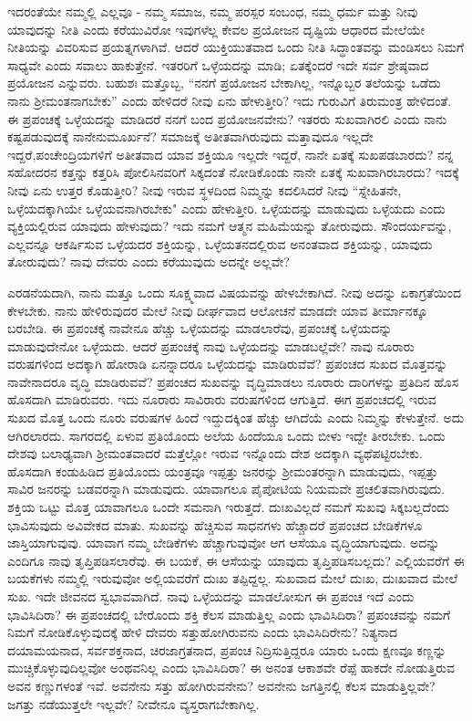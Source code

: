 ಇದರಂತೆಯೇ ನಮ್ಮಲ್ಲಿ ಎಲ್ಲವೂ - ನಮ್ಮ ಸಮಾಜ, ನಮ್ಮ ಪರಸ್ಪರ ಸಂಬಂಧ, ನಮ್ಮ ಧರ್ಮ ಮತ್ತು ನೀವು ಯಾವುದನ್ನು ನೀತಿ ಎಂದು ಕರೆಯುವಿರೋ ಇವುಗಳೆಲ್ಲ ಕೇವಲ ಪ್ರಯೋಜನ ದೃಷ್ಟಿಯ ಆಧಾರದ ಮೇಲೆಯೇ ನೀತಿಯನ್ನು ವಿವರಿಸುವ ಪ್ರಯತ್ನಗಳಾಗಿವೆ. ಆದರೆ ಯುಕ್ತಿಯುತವಾದ ಒಂದು ನೀತಿ ಸಿದ್ಧಾಂತವನ್ನು ಮಂಡಿಸಲು ನಿಮಗೆ ಸಾಧ್ಯವೇ ಎಂದು ಸವಾಲು ಹಾಕುತ್ತೇನೆ. ಇತರರಿಗೆ ಒಳ್ಳೆಯದನ್ನು ಮಾಡಿ; ಏತಕ್ಕೆಂದರೆ ಇದೇ ಸರ್ವ ಶ್ರೇಷ್ಠವಾದ ಪ್ರಯೋಜನ ಎನ್ನುವರು. ಬಹುಶಃ ಮತ್ತೊಬ್ಬ, “ನನಗೆ ಪ್ರಯೋಜನ ಬೇಕಾಗಿಲ್ಲ, ಇನ್ನೊಬ್ಬರ ತಲೆಯನ್ನು ಒಡೆದು ನಾನು ಶ‍್ರೀಮಂತ\-ನಾಗಬೇಕು'' ಎಂದು ಹೇಳಿದರೆ ನೀವು ಏನು ಹೇಳುತ್ತೀರಿ? ಇದು ಗುರುವಿಗೆ ತಿರುಮಂತ್ರ ಹೇಳಿದಂತೆ. ಈ ಪ್ರಪಂಚಕ್ಕೆ ಒಳ್ಳೆಯದನ್ನು ಮಾಡಿದರೆ ನನಗೆ ಬಂದ ಪ್ರಯೋಜನವೇನು? ಇತರರು ಸುಖವಾಗಿರಲಿ ಎಂದು ನಾನು ಕಷ್ಟಪಡುವುದಕ್ಕೆ ನಾನೇನು\break ಮೂರ್ಖನೆ? ಸಮಾಜಕ್ಕೆ ಅತೀತವಾಗಿರುವುದು ಮತ್ತಾವುದೂ ಇಲ್ಲದೇ ಇದ್ದರೆ,\break ಪಂಚೇಂದ್ರಿಯಗಳಿಗೆ ಅತೀತವಾದ ಯಾವ ಶಕ್ತಿಯೂ ಇಲ್ಲದೇ ಇದ್ದರೆ, ನಾನೇ ಏತಕ್ಕೆ ಸುಖಪಡಬಾರದು? ನನ್ನ ಸಹೋದರನ ಕತ್ತನ್ನು ಕತ್ತರಿಸಿ ಪೋಲಿಸಿನವರಿಗೆ ಸಿಕ್ಕದಂತೆ ನೋಡಿಕೊಂಡು ನಾನೇ ಏತಕ್ಕೆ ಸುಖವಾಗಿರಬಾರದು? ಇದಕ್ಕೆ ನೀವು ಏನು ಉತ್ತರ ಕೊಡುತ್ತೀರಿ? ನೀವು ಇರುವ ಸ್ಥಳದಿಂದ ನಿಮ್ಮನ್ನು ಕದಲಿಸಿದರೆ ನೀವು “ಸ್ನೇಹಿತನೇ, ಒಳ್ಳೆಯದಕ್ಕಾಗಿಯೇ ಒಳ್ಳೆಯವನಾಗಿರಬೇಕು" ಎಂದು ಹೇಳುತ್ತೀರಿ. ಒಳ್ಳೆಯದನ್ನು ಮಾಡುವುದು ಒಳ್ಳೆಯದು ಎಂದು ವ್ಯಕ್ತಿಯಲ್ಲಿರುವ ಯಾವುದು ಹೇಳುವುದು? ಇದು ನಮಗೆ ಆತ್ಮನ ಮಹಿಮೆಯನ್ನು ತೋರುವುದು. ಸೌಂದರ್ಯವನ್ನು, ಎಲ್ಲವನ್ನೂ ಆಕರ್ಷಿಸುವ ಒಳ್ಳೆಯದರ ಶಕ್ತಿಯನ್ನು, ಒಳ್ಳೆಯತನದಲ್ಲಿರುವ ಅನಂತವಾದ ಶಕ್ತಿಯನ್ನು, ಯಾವುದು ತೋರುವುದು? ನಾವು ದೇವರು ಎಂದು ಕರೆಯುವುದು ಅದನ್ನೇ ಅಲ್ಲವೇ?

ಎರಡನೆಯದಾಗಿ, ನಾನು ಮತ್ತೂ ಒಂದು ಸೂಕ್ಷ್ಮವಾದ ವಿಷಯವನ್ನು ಹೇಳಬೇಕಾಗಿದೆ. ನೀವು ಅದನ್ನು ಏಕಾಗ್ರತೆಯಿಂದ ಕೇಳಬೇಕು. ನಾನು ಹೇಳಿರುವುದರ ಮೇಲೆ ನೀವು ದೀರ್ಘವಾದ ಆಲೋಚನೆ ಮಾಡದೇ ಯಾವ ತೀರ್ಮಾನಕ್ಕೂ ಬರಬೇಡಿ. ಈ ಪ್ರಪಂಚಕ್ಕೆ ನಾವೇನೂ ಹೆಚ್ಚು ಒಳ್ಳೆಯದನ್ನು ಮಾಡಲಾರೆವು, ಪ್ರಪಂಚಕ್ಕೆ ಒಳ್ಳೆಯದನ್ನು ಮಾಡುವುದೇನೋ ಒಳ್ಳೆಯದು. ಆದರೆ ಪ್ರಪಂಚಕ್ಕೆ ನಾವು ಒಳ್ಳೆಯದನ್ನು ಮಾಡಬಲ್ಲೆವೇ? ನಾವು ನೂರಾರು ವರುಷಗಳಿಂದ ಅದಕ್ಕಾಗಿ ಹೋರಾಡಿ ಏನನ್ನಾದರೂ ಒಳ್ಳೆಯದನ್ನು ಮಾಡಿರುವೆವೆ? ಪ್ರಪಂಚದ ಸುಖದ ಮೊತ್ತವನ್ನು ನಾವೇನಾದರೂ ವೃದ್ಧಿ ಮಾಡಿರುವವೆ? ಪ್ರಪಂಚದ ಸುಖವನ್ನು ವೃದ್ಧಿಮಾಡಲು ನೂರಾರು ದಾರಿಗಳನ್ನು ಪ್ರತಿದಿನ ಹೊಸ ಹೊಸದಾಗಿ ಮಾಡಿರುವರು. ಇದು ನೂರಾರು ಸಾವಿರಾರು ವರುಷಗಳಿಂದ ಆಗುತ್ತಿದೆ. ಈಗ ಪ್ರಪಂಚದಲ್ಲಿ ಇರುವ ಸುಖದ ಮೊತ್ತ ಒಂದು ನೂರು ವರುಷಗಳ ಹಿಂದೆ ಇದ್ದುದಕ್ಕಿಂತ ಹೆಚ್ಚು ಆಗಿದೆಯೆ ಎಂದು ನಿಮ್ಮನ್ನು ಕೇಳುತ್ತೇನೆ. ಅದು ಆಗಿರಲಾರದು. ಸಾಗರದಲ್ಲಿ ಏಳುವ ಪ್ರತಿಯೊಂದು ಅಲೆಯ ಹಿಂದೆಯೂ ಒಂದು ಬೀಳು ಇದ್ದೇ ತೀರಬೇಕು. ಒಂದು ದೇಶವು ಬಲಾಢ್ಯವಾಗಿ ಶ‍್ರೀಮಂತವಾದರೆ ಮತ್ತೆಲ್ಲೋ ಇರುವ ಇನ್ನೊಂದು ದೇಶ ಅದಕ್ಕಾಗಿ ವ್ಯಥೆಪಟ್ಟಿರಬೇಕು. ಹೊಸದಾಗಿ ಕಂಡುಹಿಡಿದ ಪ್ರತಿಯೊಂದು ಯಂತ್ರವೂ ಇಪ್ಪತ್ತು ಜನರನ್ನು ಶ‍್ರೀಮಂತರನ್ನಾಗಿ ಮಾಡುವುದು, ಇಪ್ಪತ್ತು ಸಾವಿರ ಜನರನ್ನು ಬಡವರನ್ನಾಗಿ ಮಾಡುವುದು. ಯಾವಾಗಲೂ ಪೈಪೋಟಿಯ ನಿಯಮವೇ ಪ್ರಚಲಿತವಾಗಿರುವುದು. ಶಕ್ತಿಯ ಒಟ್ಟು ಮೊತ್ತ ಯಾವಾಗಲೂ ಒಂದೇ ಸಮನಾಗಿ ಇರುತ್ತದೆ. ದುಃಖವಿಲ್ಲದೆ ನಮಗೆ ಸುಖವು ಸಿಕ್ಕಬಲ್ಲದೆಂದು ಭಾವಿಸುವುದು ಅವಿವೇಕದ ಮಾತು. ಸುಖವನ್ನು ಹೆಚ್ಚಿಸುವ ಸಾಧನಗಳು ಹೆಚ್ಚಾದರೆ ಪ್ರಪಂಚದ ಬೇಡಿಕೆಗಳೂ ಜಾಸ್ತಿಯಾಗುವುವು. ಯಾವಾಗ ನಮ್ಮ ಬೇಡಿಕೆಗಳು ಹೆಚ್ಚಾಗುವುವೋ ಆಗ ಆಸೆಯೂ ವೃದ್ಧಿಯಾಗುವುದು. ಅದನ್ನು ಎಂದಿಗೂ ನಾವು ತೃಪ್ತಿಪಡಿಸಲಾರೆವು. ಈ ಬಯಕೆ, ಈ ಆಸೆಯನ್ನು ಯಾವುದು ತೃಪ್ತಿಪಡಿಸಬಲ್ಲದು? ಎಲ್ಲಿಯವರೆಗೆ ಈ ಬಯಕೆಗಳು ನಮ್ಮಲ್ಲಿ ಇರುವುವೋ ಅಲ್ಲಿಯವರೆಗೆ ದುಃಖ ತಪ್ಪಿದ್ದಲ್ಲ. ಸುಖವಾದ ಮೇಲೆ ದುಃಖ, ದುಃಖವಾದ ಮೇಲೆ ಸುಖ. ಇದೇ ಜೀವನದ ಸ್ವಭಾವವಾಗಿದೆ. ನಾವು ಒಳ್ಳೆಯದನ್ನು ಮಾಡಲೋಸುಗ ಈ ಪ್ರಪಂಚ ಇದೆ ಎಂದು ಭಾವಿಸಿದಿರಾ? ಈ ಪ್ರಪಂಚದಲ್ಲಿ ಬೇರೊಂದು ಶಕ್ತಿ ಕೆಲಸ ಮಾಡುತ್ತಿಲ್ಲ ಎಂದು ಭಾವಿಸಿದಿರಾ? ಪ್ರಪಂಚವನ್ನು ನಮಗೆ ನಿಮಗೆ ನೋಡಿಕೊಳ್ಳುವುದಕ್ಕೆ ಹೇಳಿ ದೇವರು ಸತ್ತುಹೋಗಿರುವನು ಎಂದು ಭಾವಿಸಿದಿರೇನು? ನಿತ್ಯನಾದ ದಯಾಮಯನಾದ, ಸರ್ವಶಕ್ತನಾದ, ಚಿರಜಾಗ್ರತನಾದ, ಪ್ರಪಂಚ ನಿದ್ರಿಸುತ್ತಿದ್ದರೂ ಯಾರು ಒಂದು ಕ್ಷಣವೂ ಕಣ್ಣನ್ನು ಮುಚ್ಚಿಕೊಳ್ಳುವುದಿಲ್ಲವೋ ಅಂಥವನಿಲ್ಲ ಎಂದು ಭಾವಿಸಿದಿರಾ? ಈ ಅನಂತ ಆಕಾಶವೇ ರೆಪ್ಪೆ ಹಾಕದೇ ನೋಡುತ್ತಿರುವ ಅವನ ಕಣ್ಣುಗಳಂತೆ ಇವೆ. ಅವನೇನು ಸತ್ತು ಹೋಗಿರುವನೇನು? ಅವನೇನು ಜಗತ್ತಿನಲ್ಲಿ ಕೆಲಸ ಮಾಡುತ್ತಿಲ್ಲವೇ? ಜಗತ್ತು ನಡೆಯುತ್ತಲೇ ಇಲ್ಲವೇ? ನೀವೇನೂ ವ್ಯಸ್ತರಾಗಬೇಕಾಗಿಲ್ಲ.

